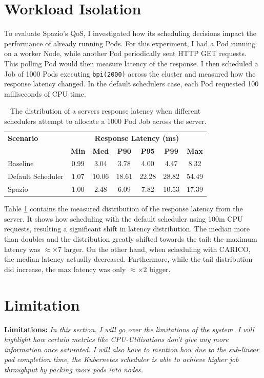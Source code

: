 \section{Workload Isolation}
\label{sec:workload-isolation}
To evaluate Spazio's QoS, I investigated how its scheduling decisions impact the
performance of already running Pods. For this experiment, I had a Pod running on
a worker Node, while another Pod periodically sent HTTP GET requests. This
polling Pod would then measure latency of the response. I then scheduled a Job
of 1000 Pods executing \texttt{bpi(2000)} across the cluster and measured how
the response latency changed. In the default schedulers case, each Pod requested
100 milliseconds of CPU time.

\begin{table}[h!]
\centering
    \begin{tabular}{|l|c|c|c|c|c|c|}
    \hline
    \textbf{Scenario} & \multicolumn{6}{c|}{\textbf{Response Latency (ms)}} \\
    \cline{2-7}
    & \textbf{Min} & \textbf{Med} & \textbf{P90} & \textbf{P95} & \textbf{P99} & \textbf{Max} \\
    \hline
    Baseline & 0.99 & 3.04 & 3.78 & 4.00 & 4.47 & 8.32 \\
    Default Scheduler & 1.07 & 10.06 & 18.61 & 22.28 & 28.82 & 54.49\\
    Spazio  & 1.00 & 2.48 & 6.09 & 7.82 & 10.53 & 17.39\\
    \hline
    \end{tabular}
    \caption{The distribution of a servers response latency when different
    schedulers attempt to allocate a 1000 Pod Job across the server.}
    \label{tab:impacted-latency}
\end{table}

Table \ref{tab:impacted-latency} contains the measured distribution of the
response latency from the server. It shows how scheduling with the default
scheduler using 100m CPU requests, resulting a significant shift in latency
distribution. The median more than doubles and the distribution greatly shifted
towards the tail: the maximum latency was $\approx \times7$ larger. On the other
hand, when scheduling with CARICO, the median latency actually decreased.
Furthermore, while the tail distribution did increase, the max latency was only
$\approx \times2$ bigger.

\section{Limitation}
\begin{tcolorbox}[boxsep=0mm,left=2.5mm,right=2.5mm]
    \textbf{Limitations:} {\em In this section, I will go over the limitations
    of the system. I will highlight how certain metrics like CPU-Utilisations
    don't give any more information once saturated. I will also have to mention
    how due to the sub-linear pod completion time, the Kubernetes scheduler is
    able to achieve higher job throughput by packing more pods into nodes.
    }
\end{tcolorbox}

